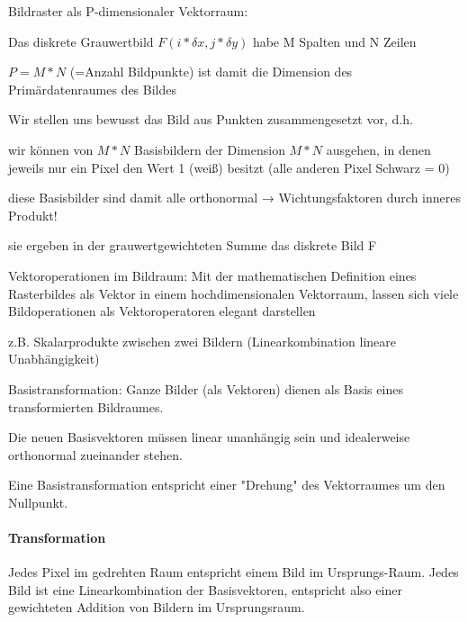 \documentclass[landscape]{article}
\begin{document}
\begin{multicols}{3}
  Bildraster als P-dimensionaler Vektorraum:
  \begin{itemize*}
    \item Das diskrete Grauwertbild $F (i* \delta x, j * \delta y )$ habe M Spalten und N Zeilen
    \item $P = M * N$ (=Anzahl Bildpunkte) ist damit die Dimension des Primärdatenraumes des Bildes
    \item Wir stellen uns bewusst das Bild aus Punkten zusammengesetzt vor, d.h.
          \begin{itemize*}
            \item wir können von $M * N$ Basisbildern der Dimension $M * N$ ausgehen, in denen jeweils nur ein Pixel den Wert 1 (weiß) besitzt (alle anderen Pixel Schwarz = 0)
            \item diese Basisbilder sind damit alle orthonormal → Wichtungsfaktoren durch inneres Produkt!
            \item sie ergeben in der grauwertgewichteten Summe das diskrete Bild F
          \end{itemize*}
  \end{itemize*}
  
  
  Vektoroperationen im Bildraum: Mit der mathematischen Definition eines Rasterbildes als Vektor in einem hochdimensionalen Vektorraum, lassen sich viele Bildoperationen als Vektoroperatoren elegant darstellen
  \begin{itemize*}
    \item z.B. Skalarprodukte zwischen zwei Bildern (Linearkombination lineare Unabhängigkeit)
    \item Basistransformation: Ganze Bilder (als Vektoren) dienen als Basis eines transformierten Bildraumes.
    \item Die neuen Basisvektoren müssen linear unanhängig sein und idealerweise orthonormal zueinander stehen.
    \item Eine Basistransformation entspricht einer "Drehung" des Vektorraumes um den Nullpunkt.
  \end{itemize*}
  
  \paragraph{Transformation}
  Jedes Pixel im gedrehten Raum entspricht einem Bild im Ursprungs-Raum.
  Jedes Bild ist eine Linearkombination der Basisvektoren, entspricht also einer gewichteten Addition von Bildern im Ursprungsraum.
  

\end{multicols}
\end{document}
